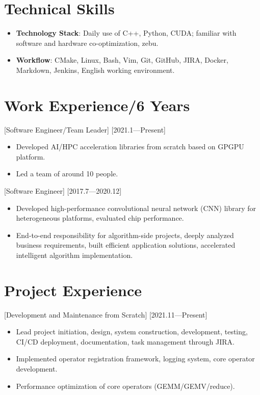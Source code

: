 \documentclass{resume}
\begin{document}
\section{Technical Skills}

\begin{itemize}
  \item \textbf{Technology Stack}: Daily use of C++, Python, CUDA; familiar with software and hardware co-optimization, zebu.
  \item \textbf{Workflow}: CMake, Linux, Bash, Vim, Git, GitHub, JIRA, Docker, Markdown, Jenkins, English working environment.
\end{itemize}

\section{Work Experience/6 Years}

[Software Engineer/Team Leader]
[2021.1—Present]

\begin{itemize}
  \item Developed AI/HPC acceleration libraries from scratch based on GPGPU platform.
  \item Led a team of around 10 people.
\end{itemize}

[Software Engineer]
[2017.7—2020.12] 

\begin{itemize}
  \item Developed high-performance convolutional neural network (CNN) library for heterogeneous platforms, evaluated chip performance.
  \item End-to-end responsibility for algorithm-side projects, deeply analyzed business requirements, built efficient application solutions, accelerated intelligent algorithm implementation.
\end{itemize}

\section{Project Experience}

[Development and Maintenance from Scratch]
[2021.11—Present]

\begin{itemize}
  \item Lead project initiation, design, system construction, development, testing, CI/CD deployment, documentation, task management through JIRA.
  \item Implemented operator registration framework, logging system, core operator development.
  \item Performance optimization of core operators (GEMM/GEMV/reduce).
\end{itemize}
\end{document}
